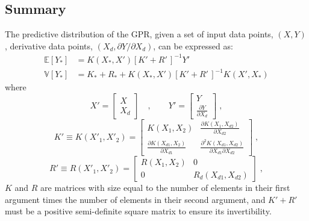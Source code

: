 \documentclass{article}
\begin{document}
\subsection{Summary}
\label{subsec:GPRSummary}

The predictive distribution of the GPR, given a set of input data points, $\left(X,Y\right)$, derivative data points, $\left(X_d,\partial Y/\partial X_d\right)$, can be expressed as:
\begin{equation}
\label{eq:GPRPredictionSummary}
\begin{aligned}
	\mathbb{E}\!\left[Y_*\right] &= K\!\left(X_*,X'\right) \left[K' + R'\,\right]^{-1} Y' \\
	\mathbb{V}\!\left[Y_*\right] &= K_* + R_* + K\!\left(X_*,X'\right) \left[K' + R'\,\right]^{-1} K\!\left(X',X_*\right)
\end{aligned}
\end{equation}
where
\begin{equation}
\label{eq:GPRDerivativeInputSummary}
	X' =
	\begin{bmatrix}
	X \\ X_d
	\end{bmatrix}
	\quad, \qquad
	Y' =
	\begin{bmatrix}
	Y \\ \frac{\partial Y}{\partial X_d}
	\end{bmatrix} \;,
\end{equation}
\begin{equation}
\label{eq:GPRKernelDerivativeInputSummary}
	K' \equiv K\!\left(X'_1,X'_2\right) =
	\begin{bmatrix}
	K\!\left(X_1,X_2\right) & \frac{\partial K\!\left(X_1,X_{d2}\right)}{\partial X_{d2}} \\
	\frac{\partial K\!\left(X_{d1},X_2\right)}{\partial X_{d1}} & \frac{\partial^2 K\!\left(X_{d1},X_{d2}\right)}{\partial X_{d1} \partial X_{d2}}
	\end{bmatrix} \;,
\end{equation}
\begin{equation}
\label{eq:GPRHeteroscedasticNoiseMatrixDerivativeInputSummary}
	R' \equiv R\!\left(X'_1,X'_2\right) =
	\begin{bmatrix}
	R\!\left(X_1,X_2\right) & 0 \\
	0 & R_d\!\left(X_{d1},X_{d2}\right)
	\end{bmatrix} \;,
\end{equation}
$K$ and $R$ are matrices with size equal to the number of elements in their first argument times the number of elements in their second argument, and $K' + R'$ must be a positive semi-definite square matrix to ensure its invertibility.
\end{document}
